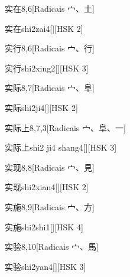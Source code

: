 \begin{entry}{实在}{8,6}[Radicais ⼧、⼟]
  \begin{phonetics}{实在}{shi2zai4}[][HSK 2]
  \end{phonetics}
\end{entry}

\begin{entry}{实行}{8,6}[Radicais ⼧、⾏]
  \begin{phonetics}{实行}{shi2xing2}[][HSK 3]
  \end{phonetics}
\end{entry}

\begin{entry}{实际}{8,7}[Radicais ⼧、⾩]
  \begin{phonetics}{实际}{shi2ji4}[][HSK 2]
  \end{phonetics}
\end{entry}

\begin{entry}{实际上}{8,7,3}[Radicais ⼧、⾩、⼀]
  \begin{phonetics}{实际上}{shi2 ji4 shang4}[][HSK 3]
  \end{phonetics}
\end{entry}

\begin{entry}{实现}{8,8}[Radicais ⼧、⾒]
  \begin{phonetics}{实现}{shi2xian4}[][HSK 2]
  \end{phonetics}
\end{entry}

\begin{entry}{实施}{8,9}[Radicais ⼧、⽅]
  \begin{phonetics}{实施}{shi2shi1}[][HSK 4]
  \end{phonetics}
\end{entry}

\begin{entry}{实验}{8,10}[Radicais ⼧、⾺]
  \begin{phonetics}{实验}{shi2yan4}[][HSK 3]
  \end{phonetics}
\end{entry}

